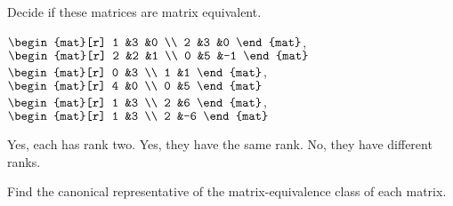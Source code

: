 \begin{exercises}
  \recommended \item 
    Decide if these matrices are matrix equivalent.
    \begin{exparts}
      \partsitem \( \begin{mat}[r]
                 1  &3  &0  \\
                 2  &3  &0
               \end{mat} \),
            \( \begin{mat}[r]
                 2  &2  &1  \\
                 0  &5  &-1
               \end{mat} \)
      \partsitem \( \begin{mat}[r]
                 0  &3  \\
                 1  &1
               \end{mat} \),
            \( \begin{mat}[r]
                 4  &0  \\
                 0  &5
               \end{mat} \)
      \partsitem \( \begin{mat}[r]
                 1  &3  \\
                 2  &6
               \end{mat} \),
            \( \begin{mat}[r]
                 1  &3  \\
                 2  &-6
               \end{mat} \)
    \end{exparts}
    \begin{answer}
      \begin{exparts}
        \partsitem Yes, each has rank two.
        \partsitem Yes, they have the same rank.
        \partsitem No, they have different ranks.
      \end{exparts}  
    \end{answer}
  \recommended \item
    Find the canonical representative of the matrix-equivalence class of
    each matrix.
\end{exercises}
